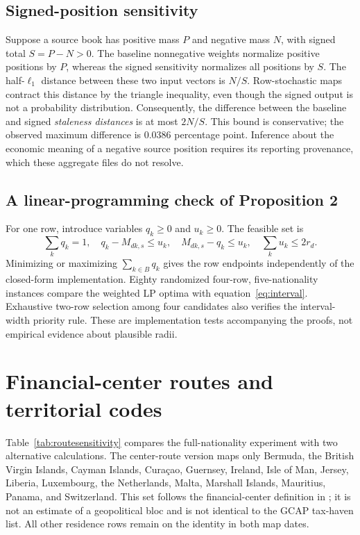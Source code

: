 \documentclass[11pt,a4paper]{article}
\begin{document}
\subsection{Signed-position sensitivity}
Suppose a source book has positive mass $P$ and negative mass $N$, with signed total $S=P-N>0$. The baseline nonnegative weights normalize positive positions by $P$, whereas the signed sensitivity normalizes all positions by $S$. The half-$\ell_1$ distance between these two input vectors is $N/S$. Row-stochastic maps contract this distance by the triangle inequality, even though the signed output is not a probability distribution. Consequently, the difference between the baseline and signed \emph{staleness distances} is at most $2N/S$. This bound is conservative; the observed maximum difference is 0.0386 percentage point. Inference about the economic meaning of a negative source position requires its reporting provenance, which these aggregate files do not resolve.

\subsection{A linear-programming check of Proposition 2}
For one row, introduce variables $q_k\geq0$ and $u_k\geq0$. The feasible set is
\begin{equation}
 \sum_kq_k=1,\quad q_k-M_{dk,s}\leq u_k,\quad
 M_{dk,s}-q_k\leq u_k,\quad\sum_ku_k\leq2r_d.
\end{equation}
Minimizing or maximizing $\sum_{k\in B}q_k$ gives the row endpoints independently of the closed-form implementation. Eighty randomized four-row, five-nationality instances compare the weighted LP optima with equation~\eqref{eq:interval}. Exhaustive two-row selection among four candidates also verifies the interval-width priority rule. These are implementation tests accompanying the proofs, not empirical evidence about plausible radii.

\section{Financial-center routes and territorial codes}\label{app:routes}
Table~\ref{tab:routesensitivity} compares the full-nationality experiment with two alternative calculations. The center-route version maps only Bermuda, the British Virgin Islands, Cayman Islands, Cura\c{c}ao, Guernsey, Ireland, Isle of Man, Jersey, Liberia, Luxembourg, the Netherlands, Malta, Marshall Islands, Mauritius, Panama, and Switzerland. This set follows the financial-center definition in \citet[footnote 13]{bbc}; it is not an estimate of a geopolitical bloc and is not identical to the GCAP tax-haven list. All other residence rows remain on the identity in both map dates.
\end{document}
